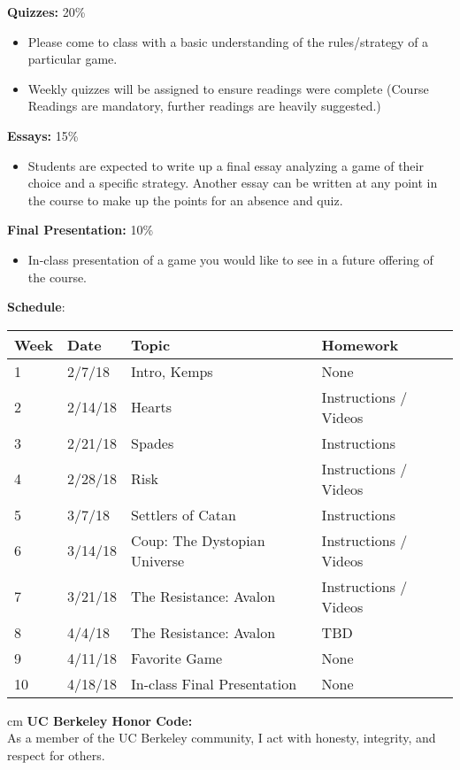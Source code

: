 \documentclass[11.5pt]{article}
\begin{document}
\begin{description}
\item \textbf{Quizzes:} 20\% 
\end{description}

\begin{itemize}
\item Please come to class with a basic understanding of the rules/strategy of a
particular game. 
\item Weekly quizzes will be assigned to ensure readings were complete (Course
Readings are mandatory, further readings are heavily suggested.)
\end{itemize}

\begin{description}
\item \textbf{Essays:} 15\% 
\end{description}

\begin{itemize}
\item Students are expected to write up a final essay analyzing a game of their choice and a specific strategy. Another essay can be written at any point in the course to make up the points for an absence and quiz.
\end{itemize}

\begin{description}
\item \textbf{Final Presentation:} 10\% 
\end{description}

\begin{itemize}
\item In-class presentation of a game you would like to see in a future offering of the course.
\end{itemize}
\newpage

\noindent\textbf{\large Schedule}: \vspace*{0.05cm}
\flushleft
\begin{tabular}{ |p{0.8cm}||p{3cm}|p{7cm}|p{4cm}|  }
 \hline
 Week & Date & Topic & Homework \\
 \hline
1  & 2/7/18 & Intro, Kemps & None \\ \hline
2 &  2/14/18  & Hearts & Instructions / Videos \\ \hline
3 & 2/21/18 & Spades & Instructions \\ \hline
4 & 2/28/18  & Risk & Instructions / Videos \\ \hline
5 & 3/7/18 & Settlers of Catan & Instructions \\ \hline
6 & 3/14/18 & Coup: The Dystopian Universe & Instructions / Videos \\ \hline
7 & 3/21/18 & The Resistance: Avalon & Instructions / Videos \\ \hline
8 & 4/4/18 & The Resistance: Avalon & TBD \\ \hline
9 & 4/11/18 & Favorite Game & None \\ \hline
10 & 4/18/18 & In-class Final Presentation & None \\
\hline
\end{tabular}
 cm
\noindent\textbf{UC Berkeley Honor Code:} \\
As a member of the UC Berkeley community, I act with honesty, integrity, and respect for others.
\end{document}

